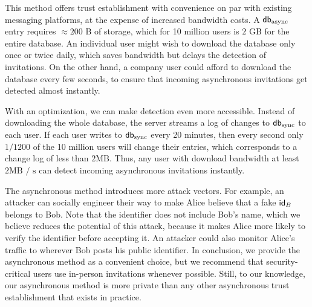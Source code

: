 This method offers trust establishment with convenience on par with existing messaging platforms, at the expense of increased bandwidth costs. A $\mathsf{db}_\text{async}$ entry requires $\approx200$ B of storage, which for 10 million users is $2$ GB for the entire database. An individual user might wish to download the database only once or twice daily, which saves bandwidth but delays the detection of invitations. On the other hand, a company user could afford to download the database every few seconds, to ensure that incoming asynchronous invitations get detected almost instantly.

With an optimization, we can make detection even more accessible. Instead of downloading the whole database, the server streams a log of changes to $\mathsf{db}_{\text{sync}}$ to each user. If each user writes to $\mathsf{db}_{\text{sync}}$ every 20 minutes, then every second only $1 / 1200$ of the 10 million users will change their entries, which corresponds to a change log of less than $2 \text{MB}$. Thus, any user with download bandwidth at least $2 \text{MB / s}$ can detect incoming asynchronous invitations instantly.

The asynchronous method introduces more attack vectors. For example, an attacker can socially engineer their way to make Alice believe that a fake $\mathsf{id}_B$ belongs to Bob. Note that the identifier does not include Bob's name, which we believe reduces the potential of this attack, because it makes Alice more likely to verify the identifier before accepting it. An attacker could also monitor Alice's traffic to wherever Bob posts his public identifier. In conclusion, we provide the asynchronous method as a convenient choice, but we recommend that security-critical users use in-person invitations whenever possible. Still, to our knowledge, our asynchronous method is more private than any other asynchronous trust establishment that exists in practice.